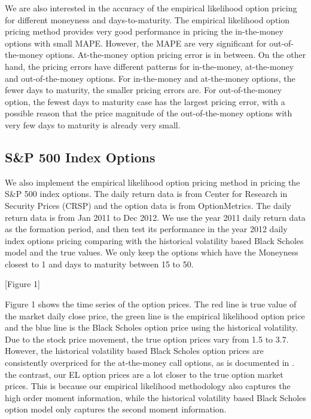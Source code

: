 We are also interested in the accuracy of the empirical likelihood option pricing for different moneyness and days-to-maturity. The empirical likelihood option pricing method provides very good performance in pricing the in-the-money options with small MAPE. However, the MAPE are very significant for out-of-the-money options. At-the-money option pricing error is in between. On the other hand, the pricing errors have different patterns for in-the-money, at-the-money and out-of-the-money options. For in-the-money and at-the-money options, the fewer days to maturity, the smaller pricing errors are. For out-of-the-money option, the fewest days to maturity case has the largest pricing error, with a possible reason that the price magnitude of the out-of-the-money options with very few days to maturity is already very small.  

\subsection{S\&P 500 Index Options}

We also implement the empirical likelihood option pricing method in pricing the S\&P 500 index options. The daily return data is from Center for Research in Security Prices (CRSP) and the option data is from OptionMetrics. The daily return data is from Jan 2011 to Dec 2012. We use the year 2011 daily return data as the formation period, and then test its performance in the year 2012 daily index options pricing comparing with the historical volatility based Black Scholes model and the true values. We only keep the options which have the Moneyness closest to 1 and days to maturity between 15 to 50. 
\begin{center}
[Figure 1]
\end{center}

Figure 1 shows the time series of the option prices. The red line is true value of the market daily close price, the green line is the empirical likelihood option price and the blue line is the Black Scholes option price using the historical volatility. Due to the stock price movement, the true option prices vary from 1.5 to 3.7. However, the historical volatility based Black Scholes option prices are consistently overpriced for the at-the-money call options, as is documented in \citet{hull1987pricing}.  the contrast, our EL option prices are a lot closer to the true option market prices. This is because our empirical likelihood methodology also captures the high order moment information, while the historical volatility based Black Scholes option model only captures the second moment information.   


